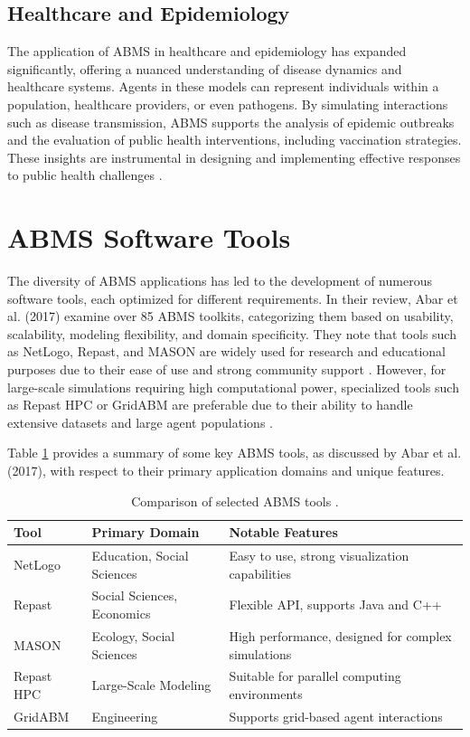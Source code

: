 \subsection{Healthcare and Epidemiology} The application of ABMS in healthcare and epidemiology has expanded significantly, offering a nuanced understanding of disease dynamics and healthcare systems. Agents in these models can represent individuals within a population, healthcare providers, or even pathogens. By simulating interactions such as disease transmission, ABMS supports the analysis of epidemic outbreaks and the evaluation of public health interventions, including vaccination strategies. These insights are instrumental in designing and implementing effective responses to public health challenges \cite{3}.

\newpage
\section{ABMS Software Tools}

The diversity of ABMS applications has led to the development of numerous software tools, each optimized for different requirements. In their review, Abar et al. (2017) examine over 85 ABMS toolkits, categorizing them based on usability, scalability, modeling flexibility, and domain specificity. They note that tools such as NetLogo, Repast, and MASON are widely used for research and educational purposes due to their ease of use and strong community support \cite{3}. However, for large-scale simulations requiring high computational power, specialized tools such as Repast HPC or GridABM are preferable due to their ability to handle extensive datasets and large agent populations \cite{3}.

Table \ref{table:abms_comparison} provides a summary of some key ABMS tools, as discussed by Abar et al. (2017), with respect to their primary application domains and unique features.

\begin{table}[h!]
\centering
\begin{tabular}{|l|l|l|}
\hline
\textbf{Tool} & \textbf{Primary Domain} & \textbf{Notable Features} \\
\hline
NetLogo & Education, Social Sciences & Easy to use, strong visualization capabilities \\
Repast & Social Sciences, Economics & Flexible API, supports Java and C++ \\
MASON & Ecology, Social Sciences & High performance, designed for complex simulations \\
Repast HPC & Large-Scale Modeling & Suitable for parallel computing environments \\
GridABM & Engineering & Supports grid-based agent interactions \\
\hline
\end{tabular}
\caption{Comparison of selected ABMS tools \cite{3}.}
\label{table:abms_comparison}
\end{table}


